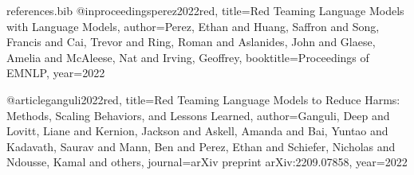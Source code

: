 \begin{filecontents*}{references.bib}
@inproceedings{perez2022red,
  title={Red Teaming Language Models with Language Models},
  author={Perez, Ethan and Huang, Saffron and Song, Francis and Cai, Trevor and Ring, Roman and Aslanides, John and Glaese, Amelia and McAleese, Nat and Irving, Geoffrey},
  booktitle={Proceedings of EMNLP},
  year={2022}
}

@article{ganguli2022red,
  title={Red Teaming Language Models to Reduce Harms: Methods, Scaling Behaviors, and Lessons Learned},
  author={Ganguli, Deep and Lovitt, Liane and Kernion, Jackson and Askell, Amanda and Bai, Yuntao and Kadavath, Saurav and Mann, Ben and Perez, Ethan and Schiefer, Nicholas and Ndousse, Kamal and others},
  journal={arXiv preprint arXiv:2209.07858},
  year={2022}
}
\end{filecontents*}

\documentclass[10pt,twocolumn]{article}

\usepackage[letterpaper,margin=0.75in]{geometry}
\usepackage{times}
\usepackage{microtype}
\usepackage[utf8]{inputenc}
\usepackage[T1]{fontenc}

\usepackage{amsmath,amssymb,amsfonts}
\usepackage{graphicx}
\usepackage{booktabs}
\usepackage{multirow}
\usepackage{array}
\usepackage{caption}
\usepackage{subcaption}
\usepackage{xcolor}
\usepackage{enumitem}
\usepackage{algorithm}
\usepackage{algpseudocode}

\usepackage[numbers,sort&compress]{natbib}
\usepackage{hyperref}
\hypersetup{
  colorlinks=true,
  linkcolor=blue!50!black,
  citecolor=blue!50!black,
  urlcolor=blue!50!black
}

\setlength{\columnsep}{0.22in}
\setlength{\textfloatsep}{8pt plus 1pt minus 2pt}
\setlength{\floatsep}{6pt plus 1pt minus 2pt}
\setlength{\intextsep}{6pt plus 1pt minus 2pt}
\captionsetup{font=small,labelfont=bf}

